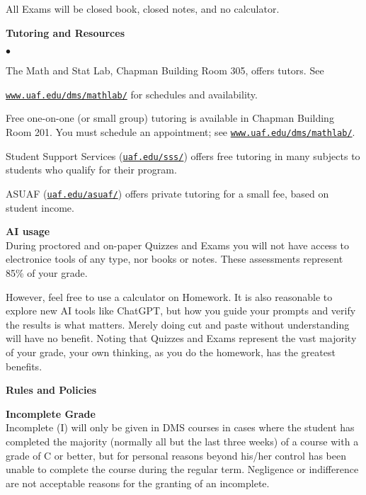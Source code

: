 \documentclass[12pt]{article}
\renewcommand{\emph}[1]{\textsf{\textbf{#1}}}
\newcommand{\localhead}[1]{\par\smallskip\textbf{#1} \smallskip\nobreak\\}%
\def\heading#1{\localhead{\large\emph{#1}}}
\def\subheading#1{\localhead{\emph{#1}}}
\newenvironment{clist}%
{\bgroup\parskip 0pt\begin{list}{$\bullet$}{\partopsep 4pt\topsep 0pt\itemsep -2pt}}%
{\end{list}\egroup}%
\begin{document}
All Exams will be closed book, closed notes, and no calculator.


\heading{Tutoring and Resources}
\vskip -30pt\strut
\begin{clist}
    \item The Math and Stat Lab, Chapman Building Room 305, offers tutors. 
	See 

	\href{http://www.uaf.edu/dms/mathlab/}{\texttt{www.uaf.edu/dms/mathlab/}} for schedules and availability.
	\item Free
one-on-one (or small group) tutoring is available in 
Chapman Building Room 201. You must schedule an
appointment; see \href{http://www.uaf.edu/dms/mathlab/}{\texttt{www.uaf.edu/dms/mathlab/}}.
	\item Student Support Services (\href{https://uaf.edu/sss/}{\texttt{uaf.edu/sss/}}) offers free tutoring in many subjects to students who qualify for their program.
	\item ASUAF (\href{https://uaf.edu/asuaf/}{\texttt{uaf.edu/asuaf/}}) offers private tutoring for a small fee, based on student income.
\end{clist}


\clearpage\newpage

\strut

\vspace{-12pt}

\heading{AI usage}
During proctored and on-paper Quizzes and Exams you will not have access to electronice tools of any type, nor books or notes.  These assessments represent 85\% of your grade.

However, feel free to use a calculator on Homework.  It is also reasonable to explore new AI tools like ChatGPT, but how you guide your prompts and verify the results is what matters.  Merely doing cut and paste without understanding will have no benefit.  Noting that Quizzes and Exams represent the vast majority of your grade, your own thinking, as you do the homework, has the greatest benefits.


\heading{Rules and Policies}
\vskip -20pt

\subheading{Incomplete Grade} 
Incomplete (I) will only be given in
  DMS courses in cases where
  the student has completed the majority (normally all but the last
  three weeks) of a course with a grade of C or better, but for
  personal reasons beyond his/her control has been unable to complete
  the course during the regular term. Negligence or indifference are
  not acceptable reasons for the granting of an incomplete. 
\end{document}
